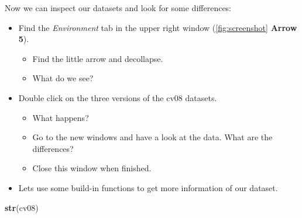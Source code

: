 \documentclass[
]{book}
\newenvironment{Shaded}{\begin{snugshade}}{\end{snugshade}}
\newcommand{\KeywordTok}[1]{\textcolor[rgb]{0.13,0.29,0.53}{\textbf{#1}}}
\newcommand{\NormalTok}[1]{#1}
\providecommand{\tightlist}{%
  \setlength{\itemsep}{0pt}\setlength{\parskip}{0pt}}
\begin{document}
Now we can inspect our datasets and look for some differences:

\begin{itemize}
\item
  Find the \emph{Environment} tab in the upper right window (\ref{fig:screenshot} \textbf{Arrow 5}).

  \begin{itemize}
  \tightlist
  \item
    Find the little arrow and decollapse.
  \item
    What do we see?\\
  \end{itemize}
\item
  Double click on the three versions of the cv08 datasets.

  \begin{itemize}
  \tightlist
  \item
    What happens?
  \item
    Go to the new windows and have a look at the data. What are the differences?
  \item
    Close this window when finished.\\
  \end{itemize}
\item
  Lets use some build-in functions to get more information of our dataset.
\end{itemize}

\begin{Shaded}
\begin{Highlighting}[numbers=left,,]
\KeywordTok{str}\NormalTok{(cv08)}
\end{Highlighting}
\end{Shaded}
\end{document}
